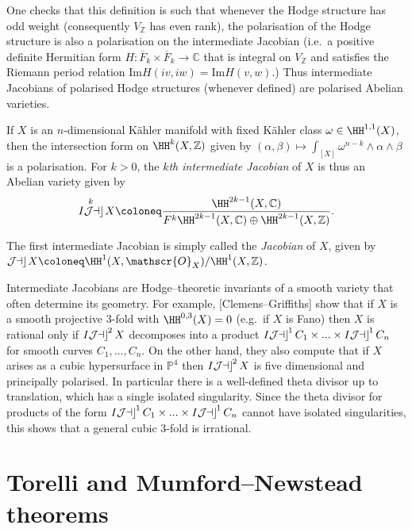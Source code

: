 One checks that this definition is such that whenever the Hodge structure has
odd weight (consequently \(V_\mathbb{Z}\) has even rank), the polarisation of
the Hodge structure is also a polarisation on the intermediate Jacobian (i.e.\ a
positive definite Hermitian form \(H:\overline{F}_k\times \overline{F}_k\to
\mathbb{C}\) that is integral on \(V_\mathbb{Z}\) and satisfies the Riemann
period relation \(\text{Im}H(iv,iw)=\text{Im}H(v,w)\).) Thus intermediate
Jacobians of polarised Hodge structures (whenever defined) are polarised Abelian
varieties.

\begin{example}
    If \(X\) is an \(n\)-dimensional  K\"ahler manifold with fixed K\"ahler
    class \(\omega\in \HH^{1,1}(X)\), then the intersection form on
    \(\HH^k(X,\mathbb{Z})\) given by \((\alpha,\beta)\mapsto
    \int_{[X]}\omega^{n-k}\wedge \alpha\wedge \beta\) is a polarisation. For
    \(k>0\), the \textit{\(k\)th intermediate Jacobian} of \(X\) is thus an
    Abelian variety given by
    \[
       \IJac^k X \coloneq
       \frac{\HH^{2k-1}(X,\mathbb{C})}{F^k\HH^{2k-1}(X,\mathbb{C})\oplus
       \HH^{2k-1}(X,\mathbb{Z})}.
    \]
\end{example}

The first intermediate Jacobian is simply called the \textit{Jacobian} of \(X\),
given by \(\Jac X\coloneq \HH^{1}(X,\mathscr{O}_X)/\HH^1(X,\mathbb{Z})\).

Intermediate Jacobians are Hodge--theoretic invariants of a smooth variety that
often determine its geometry. For example, [Clemens--Griffiths] show that if
\(X\) is a smooth projective 3-fold with \(\HH^{0,3}(X)=0\) (e.g.\ if \(X\) is
Fano) then \(X\) is rational only if \(\mathop{I\mathcal{J\kern -0.5pt a\kern -0.5pt c\kern -1pt}}^2X\) decomposes into a product
\(\mathop{I\mathcal{J\kern -0.5pt a\kern -0.5pt c\kern -1pt}}^1C_1\times ... \times \mathop{I\mathcal{J\kern -0.5pt a\kern -0.5pt c\kern -1pt}}^1C_n\) for smooth curves \(C_1,...,C_n\).
On the other hand, they also compute that if \(X\) arises as a cubic
hypersurface in \(\mathbb{P}^4\) then \(\mathop{I\mathcal{J\kern -0.5pt a\kern -0.5pt c\kern -1pt}}^2X\) is five dimensional and
principally polarised. In particular there is a well-defined theta divisor up to
translation, which has a single isolated singularity. Since the theta divisor
for products of the form \(\mathop{I\mathcal{J\kern -0.5pt a\kern -0.5pt c\kern -1pt}}^1C_1\times ... \times \mathop{I\mathcal{J\kern -0.5pt a\kern -0.5pt c\kern -1pt}}^1C_n\) cannot have
isolated singularities, this shows that a general cubic 3-fold is irrational.

\section{Torelli and Mumford--Newstead theorems}

